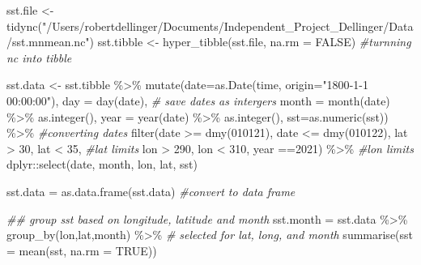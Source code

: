 \documentclass[]{tufte-handout}
\newenvironment{Shaded}{}{}
\newcommand{\AttributeTok}[1]{\textcolor[rgb]{0.49,0.56,0.16}{#1}}
\newcommand{\CommentTok}[1]{\textcolor[rgb]{0.38,0.63,0.69}{\textit{#1}}}
\newcommand{\ConstantTok}[1]{\textcolor[rgb]{0.53,0.00,0.00}{#1}}
\newcommand{\DecValTok}[1]{\textcolor[rgb]{0.25,0.63,0.44}{#1}}
\newcommand{\DocumentationTok}[1]{\textcolor[rgb]{0.73,0.13,0.13}{\textit{#1}}}
\newcommand{\FunctionTok}[1]{\textcolor[rgb]{0.02,0.16,0.49}{#1}}
\newcommand{\NormalTok}[1]{#1}
\newcommand{\OtherTok}[1]{\textcolor[rgb]{0.00,0.44,0.13}{#1}}
\newcommand{\SpecialCharTok}[1]{\textcolor[rgb]{0.25,0.44,0.63}{#1}}
\newcommand{\StringTok}[1]{\textcolor[rgb]{0.25,0.44,0.63}{#1}}
\begin{document}
\begin{Shaded}
\begin{Highlighting}[]
\NormalTok{sst.file }\OtherTok{\textless{}{-}} \FunctionTok{tidync}\NormalTok{(}\StringTok{"/Users/robertdellinger/Documents/Independent\_Project\_Dellinger/Data/sst.mnmean.nc"}\NormalTok{) }
\NormalTok{sst.tibble }\OtherTok{\textless{}{-}} \FunctionTok{hyper\_tibble}\NormalTok{(sst.file,  }\AttributeTok{na.rm =} \ConstantTok{FALSE}\NormalTok{) }\CommentTok{\#turnning nc into tibble}

\NormalTok{sst.data }\OtherTok{\textless{}{-}}\NormalTok{ sst.tibble  }\SpecialCharTok{\%\textgreater{}\%}  
  \FunctionTok{mutate}\NormalTok{(}\AttributeTok{date=}\FunctionTok{as.Date}\NormalTok{(time, }\AttributeTok{origin=}\StringTok{"1800{-}1{-}1 00:00:00"}\NormalTok{),}
         \AttributeTok{day =} \FunctionTok{day}\NormalTok{(date),  }\CommentTok{\# save dates as intergers }
         \AttributeTok{month =} \FunctionTok{month}\NormalTok{(date) }\SpecialCharTok{\%\textgreater{}\%} \FunctionTok{as.integer}\NormalTok{(),}
         \AttributeTok{year =} \FunctionTok{year}\NormalTok{(date) }\SpecialCharTok{\%\textgreater{}\%} \FunctionTok{as.integer}\NormalTok{(),}
         \AttributeTok{sst=}\FunctionTok{as.numeric}\NormalTok{(sst)) }\SpecialCharTok{\%\textgreater{}\%}  \CommentTok{\#converting dates }
  \FunctionTok{filter}\NormalTok{(date }\SpecialCharTok{\textgreater{}=} \FunctionTok{dmy}\NormalTok{(}\DecValTok{010121}\NormalTok{), date }\SpecialCharTok{\textless{}=} \FunctionTok{dmy}\NormalTok{(}\DecValTok{010122}\NormalTok{),}
\NormalTok{         lat }\SpecialCharTok{\textgreater{}} \DecValTok{30}\NormalTok{, lat }\SpecialCharTok{\textless{}} \DecValTok{35}\NormalTok{, }\CommentTok{\#lat limits}
\NormalTok{         lon }\SpecialCharTok{\textgreater{}} \DecValTok{290}\NormalTok{, lon }\SpecialCharTok{\textless{}} \DecValTok{310}\NormalTok{,}
\NormalTok{         year }\SpecialCharTok{==}\DecValTok{2021}\NormalTok{) }\SpecialCharTok{\%\textgreater{}\%} \CommentTok{\#lon limits}
\NormalTok{  dplyr}\SpecialCharTok{::}\FunctionTok{select}\NormalTok{(date, month, lon, lat, sst)}
  
\NormalTok{sst.data }\OtherTok{=} \FunctionTok{as.data.frame}\NormalTok{(sst.data) }\CommentTok{\#convert to data frame}

\DocumentationTok{\#\# group sst based on longitude, latitude and month}
\NormalTok{sst.month }\OtherTok{=}\NormalTok{ sst.data }\SpecialCharTok{\%\textgreater{}\%} 
  \FunctionTok{group\_by}\NormalTok{(lon,lat,month) }\SpecialCharTok{\%\textgreater{}\%} \CommentTok{\# selected for lat, long, and month}
  \FunctionTok{summarise}\NormalTok{(}\AttributeTok{sst =} \FunctionTok{mean}\NormalTok{(sst, }\AttributeTok{na.rm =} \ConstantTok{TRUE}\NormalTok{))}
\end{Highlighting}
\end{Shaded}
\end{document}
